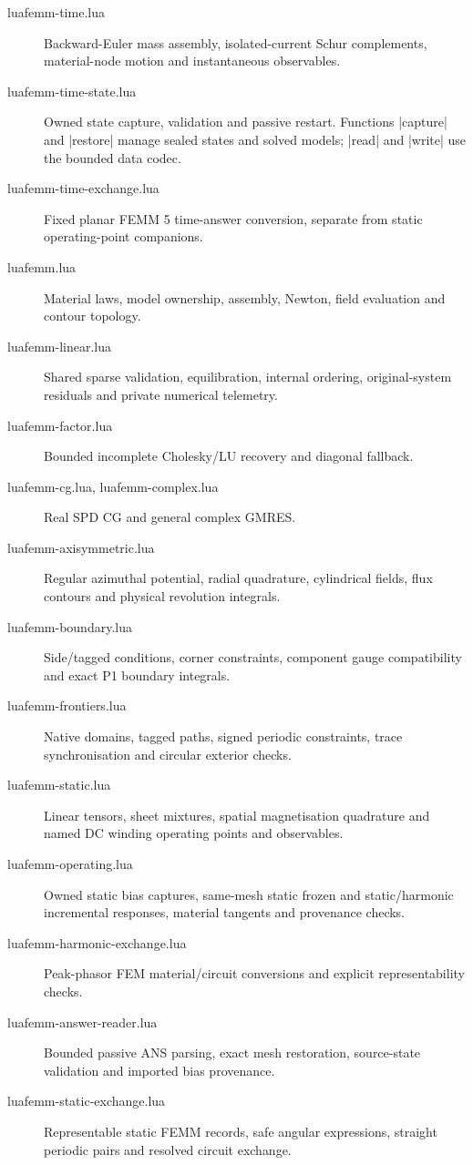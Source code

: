 \begin{description}
\item[luafemm-time.lua] Backward-Euler mass assembly, isolated-current Schur
  complements, material-node motion and instantaneous observables.
\item[luafemm-time-state.lua] Owned state capture, validation and passive restart.
  Functions |capture| and |restore| manage sealed states and solved models;
  |read| and |write| use the bounded data codec.
\item[luafemm-time-exchange.lua] Fixed planar FEMM 5 time-answer conversion,
  separate from static operating-point companions.
\item[luafemm.lua] Material laws, model ownership, assembly, Newton,
  field evaluation and contour topology.
\item[luafemm-linear.lua] Shared sparse validation, equilibration, internal ordering,
  original-system residuals and private numerical telemetry.
\item[luafemm-factor.lua] Bounded incomplete Cholesky/LU recovery and diagonal fallback.
\item[luafemm-cg.lua, luafemm-complex.lua] Real SPD CG and general complex GMRES.
\item[luafemm-axisymmetric.lua] Regular azimuthal potential, radial quadrature,
  cylindrical fields, flux contours and physical revolution integrals.
\item[luafemm-boundary.lua] Side/tagged conditions, corner constraints, component gauge
  compatibility and exact P1 boundary integrals.
\item[luafemm-frontiers.lua] Native domains, tagged paths, signed periodic
  constraints, trace synchronisation and circular exterior checks.
\item[luafemm-static.lua] Linear tensors, sheet mixtures, spatial magnetisation
  quadrature and named DC winding operating points and observables.
\item[luafemm-operating.lua] Owned static bias captures, same-mesh static frozen
  and static/harmonic incremental responses, material tangents and provenance checks.
\item[luafemm-harmonic-exchange.lua] Peak-phasor FEM material/circuit conversions
and explicit representability checks.
\item[luafemm-answer-reader.lua] Bounded passive ANS parsing, exact mesh restoration,
source-state validation and imported bias provenance.
\item[luafemm-static-exchange.lua] Representable static FEMM records, safe
  angular expressions, straight periodic pairs and resolved circuit exchange.

\end{description}
